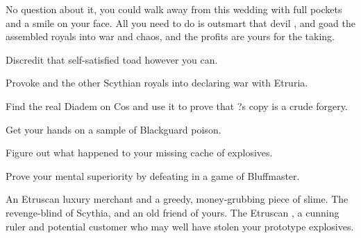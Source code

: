 \documentclass[char]{Kos}
\begin{document}
No question about it, you could walk away from this wedding with full pockets and a smile on your face. All you need to do is outsmart that devil \cMerchant{}, and goad the assembled royals into war and chaos, and the profits are yours for the taking.

\begin{itemz}[Goals]
\item Discredit that self-satisfied toad \cMerchant{} however you can.
\item Provoke \cScythiaQueen{\Monarch} \cScythiaQueen{} and the other Scythian royals into declaring war with Etruria.
\item Find the real Diadem on Cos and use it to prove that \cMerchant{}?s copy is a crude forgery.
\item Get your hands on a sample of Blackguard poison.
\item Figure out what happened to your missing cache of explosives.
\item Prove your mental superiority by defeating \cMerchant{} in a game of Bluffmaster.
\end{itemz}

\begin{contacts}
\contact{\cMerchant{}} An Etruscan luxury merchant and a greedy, money-grubbing piece of slime.
\contact{\cScythiaQueen{}} The revenge-blind \cScythiaQueen{\monarch} of Scythia, and an old friend of yours.
\contact{\cEtruriaKing{}} The Etruscan \cEtruriaKing{\monarch}, a cunning ruler and potential customer who may well have stolen your prototype explosives.
\end{contacts}
\end{document}
